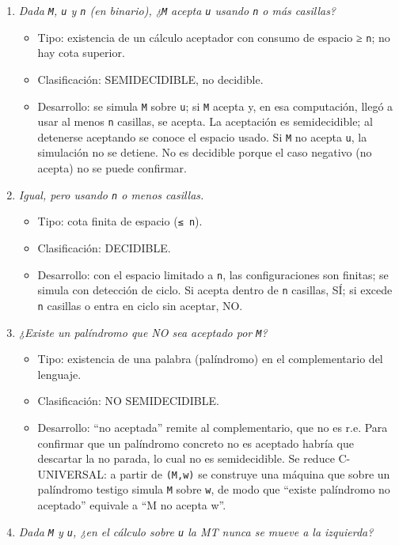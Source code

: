 \documentclass[12pt]{book} %
\providecommand{\tightlist}{%
  \setlength{\itemsep}{0pt}\setlength{\parskip}{0pt}}
\begin{document}
\begin{enumerate}
\def\labelenumi{\arabic{enumi}.}
\tightlist
\item
  \emph{Dada \texttt{M}, \texttt{u} y \texttt{n} (en binario),
  ¿\texttt{M} acepta \texttt{u} usando \texttt{n} o más casillas?}

  \begin{itemize}
  \tightlist
  \item
    Tipo: existencia de un cálculo aceptador con consumo de espacio ≥
    \texttt{n}; no hay cota superior.
  \item
    Clasificación: SEMIDECIDIBLE, no decidible.
  \item
    Desarrollo: se simula \texttt{M} sobre \texttt{u}; si \texttt{M}
    acepta y, en esa computación, llegó a usar al menos \texttt{n}
    casillas, se acepta. La aceptación es semidecidible; al detenerse
    aceptando se conoce el espacio usado. Si \texttt{M} no acepta
    \texttt{u}, la simulación no se detiene. No es decidible porque el
    caso negativo (no acepta) no se puede confirmar.
  \end{itemize}
\item
  \emph{Igual, pero usando \texttt{n} o menos casillas.}

  \begin{itemize}
  \tightlist
  \item
    Tipo: cota finita de espacio (\texttt{≤\ n}).
  \item
    Clasificación: DECIDIBLE.
  \item
    Desarrollo: con el espacio limitado a \texttt{n}, las
    configuraciones son finitas; se simula con detección de ciclo. Si
    acepta dentro de \texttt{n} casillas, SÍ; si excede \texttt{n}
    casillas o entra en ciclo sin aceptar, NO.
  \end{itemize}
\item
  \emph{¿Existe un palíndromo que NO sea aceptado por \texttt{M}?}

  \begin{itemize}
  \tightlist
  \item
    Tipo: existencia de una palabra (palíndromo) en el complementario
    del lenguaje.
  \item
    Clasificación: NO SEMIDECIDIBLE.
  \item
    Desarrollo: ``no aceptada'' remite al complementario, que no es r.e.
    Para confirmar que un palíndromo concreto no es aceptado habría que
    descartar la no parada, lo cual no es semidecidible. Se reduce
    C-UNIVERSAL: a partir de \texttt{(M,w)} se construye una máquina que
    sobre un palíndromo testigo simula \texttt{M} sobre \texttt{w}, de
    modo que ``existe palíndromo no aceptado'' equivale a ``M no acepta
    w''.
  \end{itemize}
\item
  \emph{Dada \texttt{M} y \texttt{u}, ¿en el cálculo sobre \texttt{u} la
  MT nunca se mueve a la izquierda?}


\end{enumerate}
\end{document}
